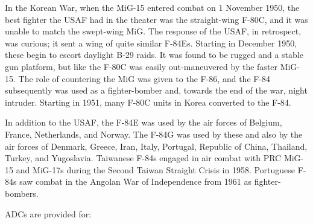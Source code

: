 In the Korean War, when the MiG-15 entered combat on 1 November 1950, the best fighter the USAF had in the theater was the straight-wing F-80C, and it was unable to match the swept-wing MiG. The response of the USAF, in retrospect, was curious; it sent a wing of quite similar F-84Es. Starting in December 1950, these begin to escort daylight B-29 raids. It was found to be rugged and a stable gun platform, but like the F-80C was easily out-maneuvered by the faster MiG-15. The role of countering the MiG was given to the F-86, and the F-84 subsequently was used as a fighter-bomber and, towards the end of the war, night intruder. Starting in 1951, many F-80C units in Korea converted to the F-84.

In addition to the USAF, the F-84E was used by the air forces of Belgium, France, Netherlands, and Norway. The F-84G was used by these and also by the air forces of Denmark, Greece, Iran, Italy, Portugal, Republic of China, Thailand, Turkey, and Yugoslavia. Taiwanese F-84s engaged in air combat with PRC MiG-15 and MiG-17s during the Second Taiwan Straight Crisis in 1958. Portuguese F-84s saw combat in the Angolan War of Independence from 1961 as fighter-bombers.

ADCs are provided for:
\begin{adclist}
\end{adclist}
